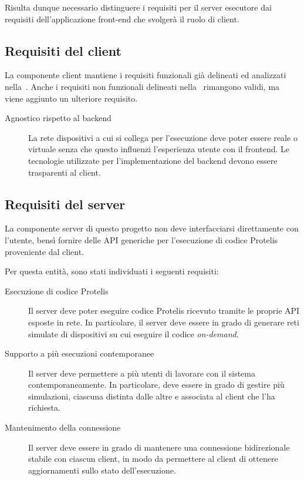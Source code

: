     Risulta dunque necessario distinguere i requisiti per il server esecutore dai requisiti dell'applicazione front-end che svolgerà il ruolo di client.

    \subsection{Requisiti del client}

      La componente client mantiene i requisiti funzionali già delineati ed analizzati nella~.
      Anche i requisiti non funzionali delineati nella~ rimangono validi, ma viene aggiunto un ulteriore requisito.

      \begin{description}
        \item[Agnostico rispetto al backend]
          La rete dispositivi a cui si collega per l'esecuzione deve poter essere reale o virtuale senza che questo influenzi l'esperienza utente con il frontend.
          Le tecnologie utilizzate per l'implementazione del backend devono essere trasparenti al client.
      \end{description}

    \subsection{Requisiti del server}
      La componente server di questo progetto non deve interfacciarsi direttamente con l'utente, bensì fornire delle API generiche per l'esecuzione di codice Protelis proveniente dal client.

      Per questa entità, sono stati individuati i seguenti requisiti:

      \begin{description}
        \item[Esecuzione di codice Protelis]
          Il server deve poter eseguire codice Protelis ricevuto tramite le proprie API esposte in rete.
          In particolare, il server deve essere in grado di generare reti simulate di dispositivi su cui eseguire il codice \emph{on-demand}.

        \item[Supporto a più esecuzioni contemporanee]
          Il server deve permettere a più utenti di lavorare con il sistema contemporaneamente.
          In particolare, deve essere in grado di gestire più simulazioni, ciascuna distinta dalle altre e associata al client che l'ha richiesta.

        \item[Mantenimento della connessione]
          Il server deve essere in grado di mantenere una connessione bidirezionale stabile con ciascun client, in modo da permettere al client di ottenere aggiornamenti sullo stato dell'esecuzione.
      \end{description}

